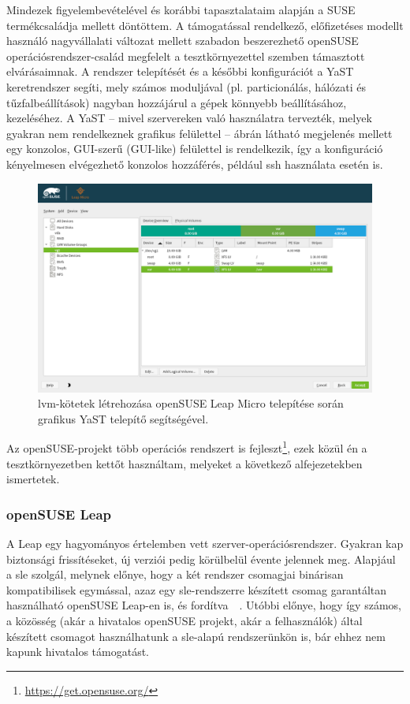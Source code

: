 Mindezek figyelembevételével és korábbi tapasztalataim alapján a SUSE termékcsaládja mellett döntöttem. A támogatással rendelkező, előfizetéses modellt használó nagyvállalati változat mellett szabadon beszerezhető openSUSE operációsrendszer-család megfelelt a tesztkörnyezettel szemben támasztott elvárásaimnak. A rendszer telepítését és a későbbi konfigurációt a YaST keretrendszer segíti, mely számos moduljával (pl. particionálás, hálózati és tűzfalbeállítások) nagyban hozzájárul a gépek könnyebb beállításához, kezeléséhez. A YaST -- mivel szervereken való használatra tervezték, melyek gyakran nem rendelkeznek grafikus felülettel --  ábrán látható megjelenés mellett egy konzolos, GUI-szerű (GUI-like) felülettel is rendelkezik, így a konfiguráció kényelmesen elvégezhető konzolos hozzáférés, például \acrshort{ssh} használata esetén is.

\begin{figure}[!ht]
	\centering
	\includegraphics[width=15cm]{figures/yast-partitioner.png}
	\caption{\acrshort{lvm}-kötetek létrehozása openSUSE Leap Micro telepítése során grafikus YaST telepítő segítségével.}
	\label{fig:yast-partitioner}
\end{figure}

Az openSUSE-projekt több operációs rendszert is fejleszt\footnote{\url{https://get.opensuse.org/}}, ezek közül én a tesztkörnyezetben kettőt használtam, melyeket a következő alfejezetekben ismertetek.

\subsubsection{openSUSE Leap}
A Leap egy hagyományos értelemben vett szerver-operációsrendszer. Gyakran kap biztonsági frissítéseket, új verziói pedig körülbelül évente jelennek meg. Alapjául a \acrfull{sle} szolgál, melynek előnye, hogy a két rendszer csomagjai binárisan kompatibilisek egymással, azaz egy \acrshort{sle}-rendszerre készített csomag garantáltan használható openSUSE Leap-en is, és fordítva~\cite{openSUSELeap15SP3intro}~\cite{SLE15SP3intro}. Utóbbi előnye, hogy így számos, a közösség (akár a hivatalos openSUSE projekt, akár a felhasználók) által készített csomagot használhatunk a \acrshort{sle}-alapú rendszerünkön is, bár ehhez nem kapunk hivatalos támogatást.

